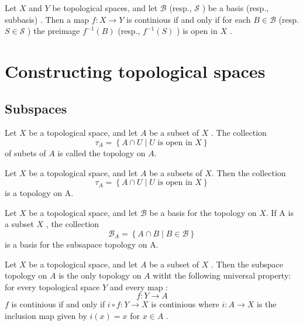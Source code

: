 \documentclass{article}
\theoremstyle{remark}
\begin{document}
\begin{theorem}
    Let $X$ and $Y$ be topological spaces, and let $ \mathscr{B} $ (resp., $\mathscr{S} $ ) be a basis (resp.,
    subbasis) . Then a map $f: X \to Y  $ is continious if and only if for each $B \in \mathscr{B} $ (resp. $S \in
    \mathscr{S} $ ) the preimage $f^{-1} \left( B \right)$ (resp., $f^{-1} \left( S \right)$ ) is open in $X$   .
\end{theorem}

\section{ Constructing topological spaces}%
\label{sec:chapter_5_constructing_topological_spaces}

\subsection{Subspaces}%
\label{sub:subspaces}

\begin{definition}
    Let $X$ be a topological space, and let $A$ be a subset of $X$ . The collection \[
    \tau _{A} = \left\{ A \cap U  \mid   U \text{ is open in }X  \right\}
    \]
    of subets of $A$ is called the topology on $A$.
\end{definition}

\begin{lemma}
    Let $X$  be a topological space, and let $A$  be a subsets of $X$. Then the collection \[
        \tau _{A} = \left\{ A \cap  U   \mid  U \text{ is open in }X \right\}
    \]
    is a topology on A.
\end{lemma}

\begin{theorem}
    Let $X$ be a topological space, and let $\mathscr{B} $  be a basis for the topology on $X$. If A is a subset $X$ ,
    the collection \[
    \mathscr{B} _{A} = \left\{ A \cap  B  \mid  B \in \mathscr{B}  \right\}
    \]
    is a basis for the subsapace topology on A.
\end{theorem}

\begin{theorem}
    Let $X$  be a topological space, and let $A$ be a subset of $X$ . Then the subspace topology on $A$  is the only
    topology on $A$  witht the following universal property: for every topological space $Y$ and every map : \[
    f: Y \to A
    \]
    $f$ is continious if and only if $i \circ  f: Y \to X$  is continious where $i : A \to X$ is the inclusion map given
    by $i\left( x \right) = x$  for $x \in  A$ .

\end{theorem}
\end{document}
